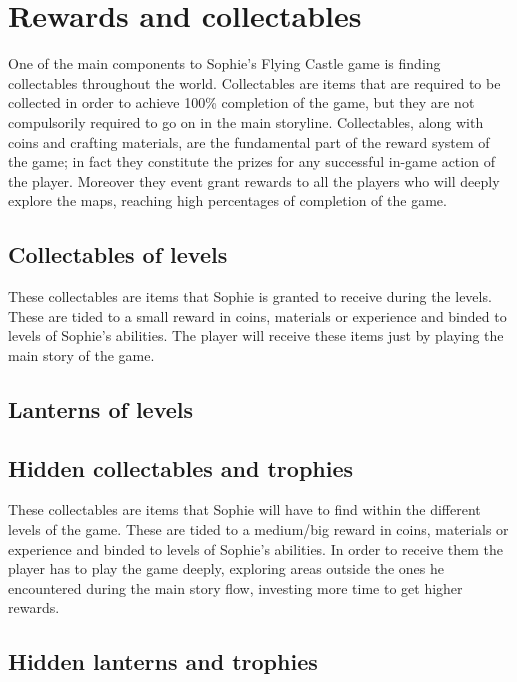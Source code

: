\section{Rewards and collectables}
One of the main components to Sophie's Flying Castle game is finding collectables throughout the world.
Collectables are items that are required to be collected in order to achieve 100\%
completion of the game, but they are not compulsorily required to go on in the main storyline. Collectables, along with coins and crafting materials, are the fundamental part of the reward system of the game; in fact they constitute the prizes for any successful in-game action of the player. Moreover they event grant rewards to all the players who will deeply explore the maps, reaching high percentages of completion of the game.

\subsection{Collectables of levels}
These collectables are items that Sophie is granted to receive during the levels. These are tided to a small reward in coins, materials or experience and binded to levels of Sophie's abilities. The player will receive these items just by playing the main story of the game. 

\subsection{Lanterns of levels}

\subsection{Hidden collectables and trophies}
These collectables are items that Sophie will have to find within the different levels of the game. These are tided to a medium/big reward in coins, materials or experience and binded to levels of Sophie's abilities. In order to receive them the player has to play the game deeply, exploring areas outside the ones he encountered during the main story flow, investing more time to get higher rewards. 

\subsection{Hidden lanterns and trophies}

